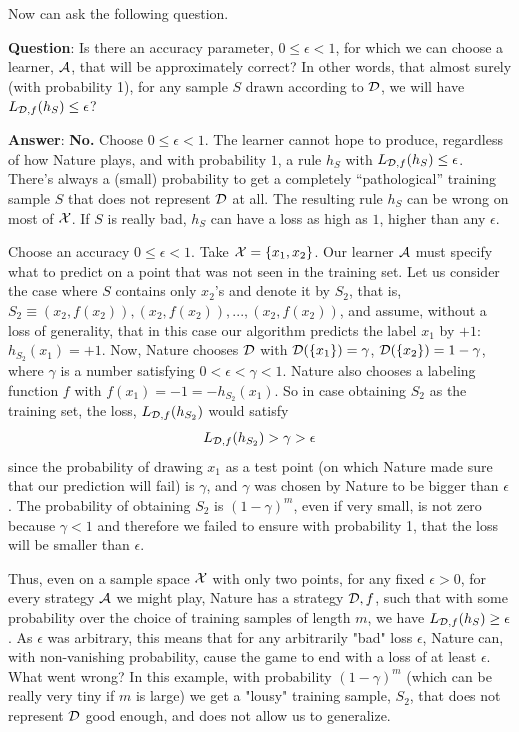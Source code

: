 {Now can ask the following question.
 
\textbf{Question}: Is there an accuracy parameter, $0\leq\epsilon<1$, for which we can choose a learner, $\mathcal{A}$,  that will be approximately correct? 
In other words, that almost surely (with probability 1), for any sample $S$ drawn according to $\mathcal{D}$, we will have  $L_{\mathcal{D},f}(h_S) \leq \epsilon$?

\textbf{Answer}: {\bf No.} 
Choose $0\leq \epsilon <1 $. The learner cannot hope to produce, regardless of how Nature plays, and with probability $1$, a rule $h_S$ with $L_{\mathcal{D},f}(h_S) \leq \epsilon$.
There's always a (small) probability to get a completely ``pathological'' training	sample $S$ that does not represent $\mathcal{D}$ at all. The resulting rule $h_S$ can
	be wrong on most of $\mathcal{X}$. If $S$ is really bad, $h_S$ can have a loss as high as $1$, higher than any $\epsilon$.
	
\begin{example}\label{counter example absolute confidence}

		Choose an accuracy $0\leq \epsilon <1 $. Take $\mathcal{X}=\left\{ x_1,x_2 \right\}$. 
		Our learner $\mathcal{A}$ must specify what to predict on a point that was not seen in the training set. 
		Let us consider the case where $S$ contains only $x_2$'s and denote it by $S_2$, that is, $S_2\equiv (x_2,f(x_2)), (x_2,f(x_2)),..., (x_2,f(x_2))$, 
		and assume, without a loss of generality, that in this case our algorithm predicts the label $x_1$ by $+1$:  $h_{S_2}(x_1)=+1$.
		Now, Nature chooses $\mathcal{D}$ with	$\mathcal{D}(\{x_1\}) = \gamma$, $\mathcal{D}(\{x_2\}) = 1-\gamma$, where $\gamma$ is a number satisfying  $0<\epsilon<\gamma<1$. 
		Nature also chooses a labeling function $f$ with  $f(x_1)=-1=-h_{S_2}(x_1)$. 
		So in case obtaining  $S_2$ as the training set,  the loss, $L_{\mathcal{D},f}(h_{S_2})$ would satisfy
		$$L_{\mathcal{D},f}(h_{S_2})>\gamma>\epsilon$$ 
		since the probability of drawing $x_1$ as a test point (on which Nature made sure that our prediction will fail)  is $\gamma$, and  $\gamma$ was chosen by Nature to be bigger than $\epsilon$. The probability of obtaining $S_2$ is $(1-\gamma)^m$, even if very small,  is not zero because $\gamma<1$ and therefore we failed to ensure with probability 1, that the loss will be smaller than $\epsilon$.  
		
		 
Thus, even on a sample space $\mathcal{X}$ with only two points, for any fixed $\epsilon>0$, for every strategy $\mathcal{A}$ we might play, Nature has a strategy $\mathcal{D},f$, such that 
		with some probability over the choice of training samples of length $m$, we have  $L_{\mathcal{D},f}(h_S) \geq \epsilon$. As $\epsilon$ was arbitrary, this means that for any arbitrarily "bad" loss $\epsilon$, Nature can, with non-vanishing probability,  cause the game to end with a loss of at least $\epsilon$.
	  What went wrong? In this example, with probability $(1-\gamma)^m$ (which can be really very tiny if $m$ is large) we get a "lousy" training sample, $S_2$, that does not represent $\mathcal{D}$  good enough, and does not allow us to generalize. 
  \end{example}
	  \vspace{3mm}
 
}
